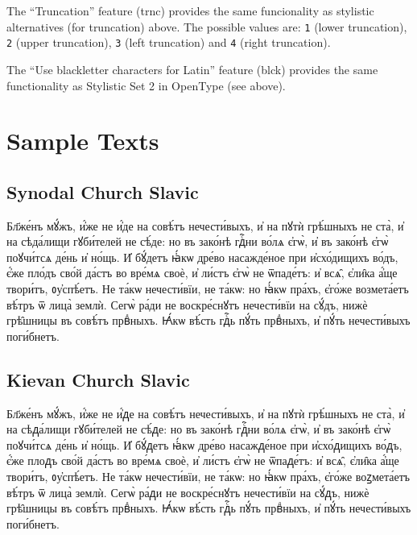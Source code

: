 The ``Truncation'' feature (trnc) provides the same funcionality as stylistic alternatives (for truncation) above. The possible values are: \verb+1+ (lower truncation), \verb+2+ (upper truncation), \verb+3+ (left truncation) and \verb+4+ (right truncation).

The ``Use blackletter characters for Latin'' feature (blck) provides the same functionality as Stylistic Set 2 in OpenType (see above).

\section{Sample Texts}

\subsection{Synodal Church Slavic}

\begin{russian}
{\glyphfont \large
Бл҃же́нъ мꙋ́жъ, и҆́же не и҆́де на совѣ́тъ нечести́выхъ, и҆ на пꙋтѝ грѣ́шныхъ не ста̀, и҆ на сѣда́лищи гꙋби́телей не сѣ́де: но въ зако́нѣ гдⷭ҇ни во́лѧ є҆гѡ̀, и҆ въ зако́нѣ є҆гѡ̀ поꙋчи́тсѧ де́нь и҆ но́щь. И҆ бꙋ́детъ ꙗ҆́кѡ дре́во насажде́ное при и҆схо́дищихъ во́дъ, є҆́же пло́дъ сво́й да́стъ во вре́мѧ своѐ, и҆ ли́стъ є҆гѡ̀ не ѿпаде́тъ: и҆ всѧ̑, є҆ли̑ка а҆́ще твори́тъ, ᲂу҆спѣ́етъ. Не та́кѡ нечести́вїи, не та́кѡ: но ꙗ҆́кѡ пра́хъ, є҆го́же возмета́етъ вѣ́тръ ѿ лица̀ землѝ. Сегѡ̀ ра́ди не воскре́снꙋтъ нечести́вїи на сꙋ́дъ, нижѐ грѣ̑шницы въ совѣ́тъ првⷣныхъ. Ꙗ҆́кѡ вѣ́сть гдⷭ҇ь пꙋ́ть првⷣныхъ, и҆ пꙋ́ть нечести́выхъ поги́бнетъ.
}
\end{russian}

\subsection{Kievan Church Slavic}

\begin{russian}
{\glyphfont \large
Бл҃же́нъ мꙋ́жъ, и҆́же не и҆́ᲁе на совѣ́тъ нечести́выхъ, и҆ на пꙋтѝ грѣ́шныхъ не ста̀, и҆ на сѣᲁа́лищи гꙋби́телей не сѣ́ᲁе: но въ зако́нѣ гᲁⷭ҇ни во́лѧ є҆гѡ̀, и҆ въ зако́нѣ є҆гѡ̀ поꙋчи́тсѧ де́нь и҆ но́щь. И҆ бꙋ́ᲁетъ ꙗ҆́кѡ дре́во насажᲁе́ное при и҆схо́ᲁищихъ во́ᲁъ, є҆́же плоᲁъ сво́й да́стъ во вре́мѧ своѐ, и҆ ли́стъ є҆гѡ̀ не ѿпаᲁе́тъ: и҆ всѧ̑, є҆ли̑ка а҆́ще твори́тъ, ᲂу҆спѣ́етъ. Не та́кѡ нечести́вїи, не та́кѡ: но ꙗ҆́кѡ пра́хъ, є҆го́же воꙁмета́етъ вѣ́тръ ѿ лица̀ землѝ. Сегѡ̀ ра́ᲁи не воскре́снꙋтъ нечести́вїи на сꙋ́ᲁъ, нижѐ грѣ̑шницы въ совѣ́тъ првⷣныхъ. Ꙗ҆́кѡ вѣ́сть гᲁⷭ҇ь пꙋ́ть првⷣныхъ, и҆ пꙋ́ть нечести́выхъ поги́бнетъ.
}
\end{russian}


